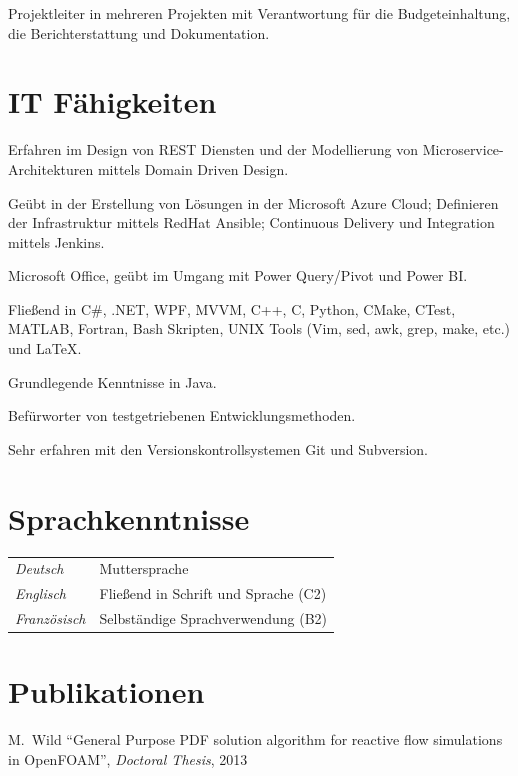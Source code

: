\documentclass[line,11pt,a4paper]{../resume}
\begin{document}
\begin{resume}
\begin{list2}
  \item Projektleiter in mehreren Projekten mit Verantwortung für die
    Budgeteinhaltung, die Berichterstattung und Dokumentation.
\end{list2}

\section{\mysidestyle IT Fähigkeiten}\vspace{6mm}
\begin{list2}
  \item Erfahren im Design von REST Diensten und der Modellierung von
    Microservice-Architekturen mittels Domain Driven Design.
  \item Geübt in der Erstellung von Lösungen in der Microsoft Azure Cloud;
    Definieren der Infrastruktur mittels RedHat Ansible; Continuous Delivery
    und Integration mittels Jenkins.
  \item Microsoft Office, geübt im Umgang mit Power Query/Pivot und Power BI.
  \item Flie{\ss}end in C\#, .NET, WPF, MVVM, C++, C, Python, CMake, CTest,
    MATLAB, Fortran, Bash Skripten, UNIX Tools (Vim, sed, awk, grep, make,
    etc.) und {\selectfont\LaTeX}.
  \item Grundlegende Kenntnisse in Java.
  \item Befürworter von testgetriebenen Entwicklungsmethoden.
  \item Sehr erfahren mit den Versionskontrollsystemen Git und Subversion.
\end{list2}

\section{\mysidestyle Sprachkenntnisse}\vspace{2mm}
\begin{tabular}{@{}ll}
  \textsl{Deutsch}   & Muttersprache \\
  \textsl{Englisch}  & Flie{\ss}end in Schrift und Sprache (C2) \\
  \textsl{Französisch}  & Selbständige Sprachverwendung (B2) \\
\end{tabular}

\section{\mysidestyle Publikationen}\vspace{2mm}
M.~Wild
``General Purpose PDF solution algorithm for reactive flow simulations in
OpenFOAM'', \textsl{Doctoral Thesis}, 2013


\end{resume}
\end{document}

